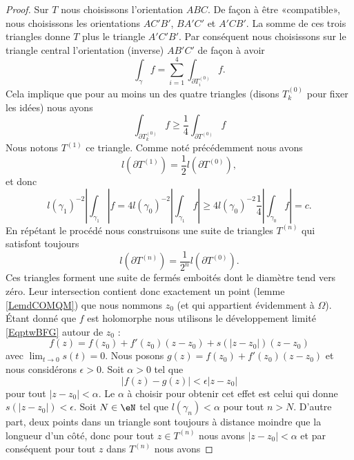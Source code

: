 \begin{proof}
    Sur \( T\) nous choisissons l'orientation \( ABC\). De façon à être «compatible», nous choisissons les orientations \( AC'B'\), \( BA'C'\) et \( A'CB'\). La somme de ces trois triangles donne \( T\) plus le triangle \( A'C'B'\). Par conséquent nous choisissons sur le triangle central l'orientation (inverse) \( AB'C'\) de façon à avoir
    \begin{equation}
        \int_{\gamma}f=\sum_{i=1}^4\int_{\partial T^{(0)}_i}f.
    \end{equation}
    Cela implique que pour au moins un des quatre triangles (disons \( T^{(0)}_k\) pour fixer les idées) nous ayons
    \begin{equation}
        \int_{\partial T^{(0)}_k}f\geq \frac{1}{ 4 }\int_{\partial T^{(0)}}f
    \end{equation}
    Nous notons \( T^{(1)}\) ce triangle. Comme noté précédemment nous avons
    \begin{equation}
        l(\partial T^{(1)})=\frac{ 1 }{2}l(\partial T^{(0)}),
    \end{equation}
    et donc
    \begin{equation}
        l(\gamma_1)^{-2}| \int_{\gamma_1} |f=4l(\gamma_0)^{-2}| \int_{\gamma_1}f |\geq 4l(\gamma_0)^{-2}\frac{1}{ 4 }| \int_{\gamma_0}f |=c.
    \end{equation}
    En répétant le procédé nous construisons une suite de triangles \( T^{(n)}\) qui satisfont toujours
    \begin{equation}
        l(\partial T^{(n)})=\frac{1}{ 2^n }l(\partial T^{(0)}).
    \end{equation}
    Ces triangles forment une suite de fermés emboités dont le diamètre tend vers zéro. Leur intersection contient donc exactement un point (lemme \ref{LemdCOMQM}) que nous nommons \( z_0\) (et qui appartient évidemment à \( \Omega\)). Étant donné que \( f\) est holomorphe nous utilisons le développement limité \eqref{EqptwBFG} autour de \( z_0\) :
    \begin{equation}
        f(z)=f(z_0)+f'(z_0)(z-z_0)+s(| z-z_0 |)(z-z_0)
    \end{equation}
    avec \( \lim_{t\to 0} s(t)=0\). Nous posons \( g(z)=f(z_0)+f'(z_0)(z-z_0)\) et nous considérons \( \epsilon>0\). Soit \( \alpha>0\) tel que
    \begin{equation}
        | f(z)-g(z) |<\epsilon| z-z_0 |
    \end{equation}
    pour tout \( | z-z_0 |<\alpha\). Le \( \alpha\) à choisir pour obtenir cet effet est celui qui donne \( s(| z-z_0 |)<\epsilon\). Soit \( N\in \eN\) tel que \( l(\gamma_n)<\alpha\) pour tout \( n>N\). D'autre part, deux points dans un triangle sont toujours à distance moindre que la longueur d'un côté, donc pour tout \( z\in T^{(n)}\) nous avons \( | z-z_0 |<\alpha\) et par conséquent pour tout \( z\) dans \( T^{(n)}\) nous avons

\end{proof}
